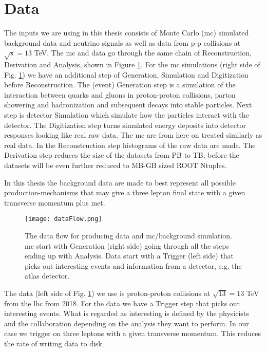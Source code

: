 \documentclass[a4paper, american, 12pt]{report}
\begin{document}
	
	\section{Data}
	\label{sect:Method-Data}
	The inputs we are using in this thesis consists of Monte Carlo (\acrshort{mc}) simulated background data and neutrino signals as well as data from p-p collisions at $\sqrt{s}=13$ TeV. The \acrshort{mc} and data go through the same chain of Reconstruction, Derivation and Analysis, shown in Figure \ref{fig:DataFlow}. For the \acrshort{mc} simulations (right side of Fig. \ref{fig:DataFlow}) we have an additional step of Generation, Simulation and Digitization before Reconstruction. The (event) Generation step is a simulation of the interaction between quarks and gluons in proton-proton collisions, parton showering and hadronization and subsequent decays into stable particles. Next step is detector Simulation which simulate how the particles interact with the detector. The Digitization step turns simulated energy deposits into detector responses looking like real raw data. The \acrshort{mc} are from here on treated similarly as real data. In the Reconstruction step histograms of the raw data are made. The Derivation step reduces the size of the datasets from PB to TB, before the datasets will be even further reduced to MB-GB sized ROOT Ntuples.
	 
	In this thesis the background data are made to best represent all possible production-mechanisms that may give a three lepton final state with a given transverse momentum plus \acrshort{met}.
	\begin{figure}[htb!]
		\hspace*{-0.6cm}
		\centering\texttt{[image: dataFlow.png]}
		\caption[Data flow for producing data and \acrshort{mc}.]{The data flow for producing data and \acrshort{mc}/background simulation. \acrshort{mc} start with Generation (right side) going through all the steps ending up with Analysis. Data start with a Trigger (left side) that picks out interesting events and information from a detector, e.g. the \acrshort{atlas} detector. \label{fig:DataFlow}}
	\end{figure}

	The data (left side of Fig. \ref{fig:DataFlow}) we use is proton-proton collisions at $\sqrt{13}=13$ TeV from the \acrshort{lhc} from 2018. For the data we have a Trigger step that picks out interesting events. What is regarded as interesting is defined by the physicists and the collaboration depending on the analysis they want to perform. In our case we trigger on three leptons with a given transverse momentum. This reduces the rate of writing data to disk. 
	
\end{document}
